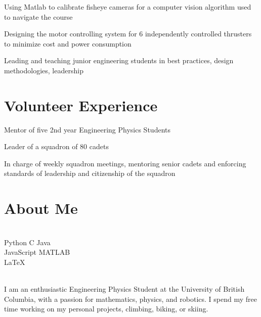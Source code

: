 \documentclass[]{deedy-resume-openfont}
\begin{document}
\begin{tightemize}
	\item Using Matlab to calibrate fisheye cameras for a computer vision algorithm used to navigate the course
	\item Designing the motor controlling system for 6 independently controlled thrusters to minimize cost and power consumption
	\item Leading and teaching junior engineering students in best practices, design methodologies, leadership
\end{tightemize}
\vspace{10pt}

\section{Volunteer Experience}
\begin{tightemize}
	\item Mentor of five 2nd year Engineering Physics Students
\end{tightemize}
\vspace{8pt}

\begin{tightemize}
	\item Leader of a squadron of 80 cadets
	\item In charge of weekly squadron meetings, mentoring senior cadets and enforcing standards of leadership and citizenship of the squadron
\end{tightemize}
\vspace{10pt}

\section{About Me}
\begin{minipage}[t]{.35\textwidth}
	 \\
	Python \textbullet{} C \textbullet{} Java \\
	JavaScript \textbullet{} MATLAB \\
	\LaTeX
	\vspace{8pt}
\end{minipage}
\hfill
\begin{minipage}[t]{.55\textwidth}
	 \\
	I am an enthusiastic Engineering Physics Student at the University of British Columbia, with a passion for mathematics, physics, and robotics. I spend my free time working on my personal projects, climbing, biking, or skiing.
\end{minipage}
\end{document}
